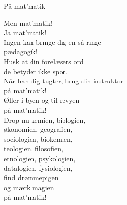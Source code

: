 \begin{song}{På mat'matik}
  \begin{SBChorus}
    Men mat’matik!\\
    Ja mat’matik!\\
    Ingen kan bringe dig en så ringe\\
    pædagogik!\\\medskip
    Husk at din forelæsers ord\\
    de betyder ikke spor.\\
    Når han dig tugter, brug din instruktor\\
    på mat’matik!\\\medskip
    Øller i byen og til revyen\\
    på mat’matik!\\\medskip
    Drop nu kemien, biologien,\\
    økonomien, geografien,\\
    sociologien, biokemien,\\
    teologien, filosofien,\\\medskip
    etnologien, psykologien,\\
    datalogien, fysiologien,\\
    find drømmepigen\\
    og mærk magien\\
    på mat’matik!
  \end{SBChorus}
\end{song}